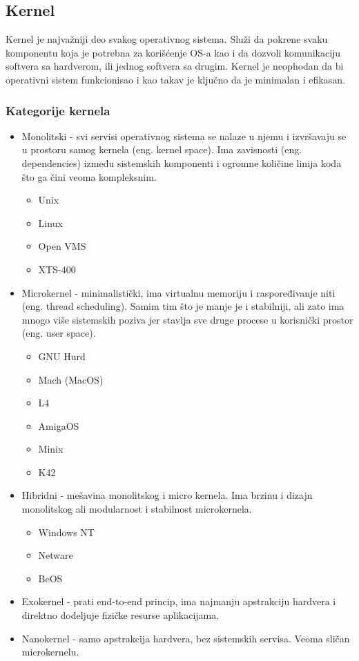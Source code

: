 \documentclass[a4paper,14pt]{article}
\begin{document}
\subsection{Kernel}
Kernel je najvažniji deo svakog operativnog sistema. Služi da pokrene svaku komponentu koja je potrebna za korišćenje OS-a kao i da dozvoli komunikaciju softvera sa hardverom, ili jednog softvera sa drugim. Kernel je neophodan da bi operativni sistem funkcionisao i kao takav je ključno da je minimalan i efikasan.

\subsubsection{Kategorije kernela}
\begin{itemize}
\item Monolitski - svi servisi operativnog sistema se nalaze u njemu i izvršavaju se u prostoru samog kernela (eng. kernel space). Ima zavisnosti (eng. dependencies) između sistemskih komponenti i ogromne količine linija koda što ga čini veoma kompleksnim.
\begin{itemize}
\item Unix
\item Linux
\item Open VMS
\item XTS-400
\end{itemize}
\item Microkernel - minimalistički, ima virtualnu memoriju i raspoređivanje niti (eng. thread scheduling). Samim tim što je manje je i stabilniji, ali zato ima mnogo više sistemskih poziva jer stavlja sve druge procese u korisnički prostor (eng. user space).
\begin{itemize}
\item GNU Hurd
\item Mach (MacOS)
\item L4
\item AmigaOS
\item Minix
\item K42
\end{itemize}
\item Hibridni - mešavina monolitskog i micro kernela. Ima brzinu i dizajn monolitskog ali modularnost i stabilnost microkernela.
\begin{itemize}
\item Windows NT
\item Netware
\item BeOS
\end{itemize}
\item Exokernel - prati end-to-end princip, ima najmanju apstrakciju hardvera i direktno dodeljuje fizičke resurse aplikacijama.
\item Nanokernel - samo apstrakcija hardvera, bez sistemskih servisa. Veoma sličan microkernelu.
\end{itemize}
\newpage
\end{document}
